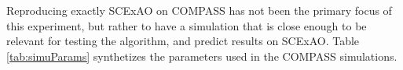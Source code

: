 \documentclass[twocolumn]{aa}
\newcommand{\og}[2]{\textcolor{orange}{\sout{#1} {#2}}}
\newcommand{\nour}[1]{\textcolor{teal}{#1}}
\begin{document}


Reproducing exactly SCExAO on COMPASS has not been the primary focus of this experiment, but rather to have a simulation that is close enough to be relevant for testing the algorithm, and predict results on SCExAO. Table \ref{tab:simuParams} synthetizes the parameters used in the COMPASS simulations.\\
\end{document}
